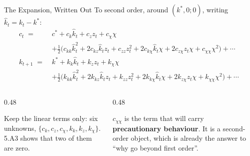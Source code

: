 \begin{frame}{The Expansion, Written Out}
\small
To second order, around $(k^{*},0;0)$, writing $\hat{k}_t=k_t-k^{*}$:
\begin{align*}
c_t \;=\;& c^{*} + c_k\hat{k}_t + c_z z_t + c_\chi \chi \\
 &+ \tfrac12\Big(c_{kk}\hat{k}_t^{2} + 2c_{kz}\hat{k}_t z_t + c_{zz}z_t^{2}
   + 2c_{k\chi}\hat{k}_t\chi + 2c_{z\chi}z_t\chi + c_{\chi\chi}\chi^{2}\Big)+\cdots\\[1mm]
k_{t+1} \;=\;& k^{*} + k_k\hat{k}_t + k_z z_t + k_\chi \chi \\
 &+ \tfrac12\Big(k_{kk}\hat{k}_t^{2} + 2k_{kz}\hat{k}_t z_t + k_{zz}z_t^{2}
   + 2k_{k\chi}\hat{k}_t\chi + 2k_{z\chi}z_t\chi + k_{\chi\chi}\chi^{2}\Big)+\cdots
\end{align*}
\medskip
\begin{columns}[T]
\begin{column}{0.48\textwidth}
\begin{conceptbox}[title=\textbf{First order}]\footnotesize
Keep the linear terms only: six unknowns, $\{c_k,c_z,c_\chi,k_k,k_z,k_\chi\}$. 5.A3 shows that two of them are zero.
\end{conceptbox}
\end{column}
\begin{column}{0.48\textwidth}
\begin{examplebox}\footnotesize
$c_{\chi\chi}$ is the term that will carry \textbf{precautionary behaviour}. It is a second-order object, which is already the answer to ``why go beyond first order''.
\end{examplebox}
\end{column}
\end{columns}
\vspace{1mm}
\end{frame}

